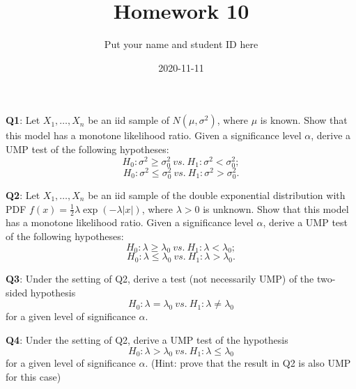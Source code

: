 \documentclass[]{article}
\title{Homework 10}
\author{Put your name and student ID here}
\date{2020-11-11}
\begin{document}
\maketitle

\textbf{Q1}: Let \(X_1,\dots,X_n\) be an iid sample of
\(N(\mu,\sigma^2)\), where \(\mu\) is known. Show that this model has a
monotone likelihood ratio. Given a significance level \(\alpha\), derive
a UMP test of the following hypotheses:
\[H_0:\sigma^2 \ge \sigma_0^2\ vs.\ H_1:\sigma^2<\sigma_0^2;\]
\[H_0:\sigma^2 \le \sigma_0^2\ vs.\ H_1:\sigma^2>\sigma_0^2.\]

\textbf{Q2}: Let \(X_1,\dots,X_n\) be an iid sample of the double
exponential distribution with PDF
\(f(x) = \frac 12\lambda\exp(-\lambda|x|)\), where \(\lambda>0\) is
unknown. Show that this model has a monotone likelihood ratio. Given a
significance level \(\alpha\), derive a UMP test of the following
hypotheses: \[H_0:\lambda \ge \lambda_0\ vs.\ H_1:\lambda < \lambda_0;\]
\[H_0:\lambda \le \lambda_0\ vs.\ H_1:\lambda > \lambda_0.\]

\textbf{Q3}: Under the setting of Q2, derive a test (not necessarily
UMP) of the two-sided hypothesis
\[H_0:\lambda =\lambda_0\ vs.\ H_1:\lambda \neq \lambda_0\] for a given
level of significance \(\alpha\).

\textbf{Q4}: Under the setting of Q2, derive a UMP test of the
hypothesis \[H_0:\lambda > \lambda_0\ vs.\ H_1:\lambda \le \lambda_0\]
for a given level of significance \(\alpha\). (Hint: prove that the
result in Q2 is also UMP for this case)
\end{document}
